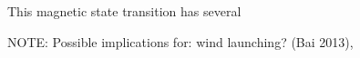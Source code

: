 This magnetic state transition has several 

NOTE: Possible implications for: wind launching? (Bai 2013), 









